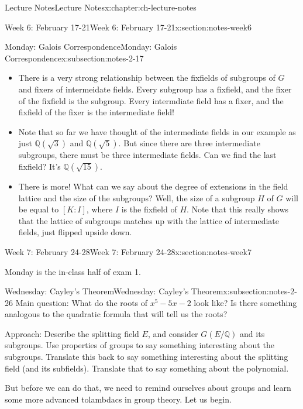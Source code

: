 \documentclass[oneside,11pt,]{book}
\newcommand{\Q}{\mathbb{Q}}
\begin{document}
\begin{chapterptx}{Lecture Notes}{}{Lecture Notes}{}{}{x:chapter:ch-lecture-notes}
\begin{sectionptx}{Week 6: February 17-21}{}{Week 6: February 17-21}{}{}{x:section:notes-week6}
\begin{subsectionptx}{Monday: Galois Correspondence}{}{Monday: Galois Correspondence}{}{}{x:subsection:notes-2-17}
\begin{itemize}[label=\textbullet]
\item{}There is a very strong relationship between the fixfields of subgroups of \(G\) and fixers of intermeidate fields. Every subgroup has a fixfield, and the fixer of the fixfield is the subgroup. Every intermdiate field has a fixer, and the fixfield of the fixer is the intermediate field!%
\item{}Note that so far we have thought of the intermediate fields in our example as just \(\mathbb Q(\sqrt{3})\) and \(\mathbb Q(\sqrt{5})\). But since there are three intermediate subgroups, there must be three intermediate fields. Can we find the last fixfield? It’s \(\mathbb Q(\sqrt{15})\).%
\item{}There is more! What can we say about the degree of extensions in the field lattice and the size of the subgroups? Well, the size of a subgroup \(H\) of \(G\) will be equal to \([K:I]\), where \(I\) is the fixfield of \(H\). Note that this really shows that the lattice of subgroups matches up with the lattice of intermediate fields, just flipped upside down.%
\end{itemize}
%
\end{subsectionptx}
\end{sectionptx}
%
%
\typeout{************************************************}
\typeout{************************************************}
%
\begin{sectionptx}{Week 7: February 24-28}{}{Week 7: February 24-28}{}{}{x:section:notes-week7}
\begin{introduction}{}%
Monday is the in-class half of exam 1.%
\end{introduction}%
%
%
\typeout{************************************************}
\typeout{************************************************}
%
\begin{subsectionptx}{Wednesday: Cayley's Theorem}{}{Wednesday: Cayley's Theorem}{}{}{x:subsection:notes-2-26}
Main question: What do the roots of \(x^5 - 5x - 2\) look like? Is there something analogous to the quadratic formula that will tell us the roots?%
\par
Approach: Describe the splitting field \(E\), and consider \(G(E/\Q)\) and its subgroups. Use properties of groups to say something interesting about the subgroups. Translate this back to say something interesting about the splitting field (and its subfields). Translate that to say something about the polynomial.%
\par
But before we can do that, we need to remind ourselves about groups and learn some more advanced tolambdacs in group theory. Let us begin.%

\end{subsectionptx}
\end{sectionptx}
\end{chapterptx}
\end{document}
